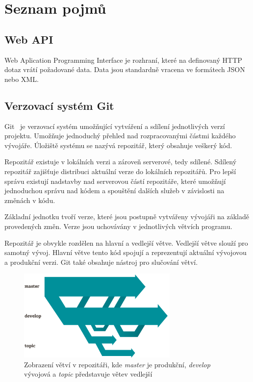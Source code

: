 \documentclass[thesis=B,czech]{FITthesis}[2012/06/26]
\begin{document}
\chapter{Seznam pojmů}

\section{Web API}
Web Aplication Programming Interface je rozhraní, které na definovaný HTTP dotaz vrátí požadované data. Data jsou standardně vracena ve formátech JSON nebo XML.

\section{Verzovací systém Git}
Git~\cite{GIT} je verzovací systém umožňující vytváření a sdílení jednotlivých verzí projektu.
Umožňuje jednoduchý přehled nad rozpracovanými částmi každého vývojáře. Úložiště systému se nazývá repozitář, který obsahuje veškerý kód.
\par
Repozitář existuje v lokálních verzi a zároveň serverové, tedy sdílené. Sdílený repozitář zajišťuje distribuci aktuální verze do lokálních 
repozitářů. Pro lepší správu existují nadstavby nad serverovou částí repozitáře, které umožňují jednoduchou
správu nad kódem a spouštění dalších služeb v závislosti na změnách v kódu.
\par
Základní jednotku tvoří verze, které jsou postupně vytvářeny vývojáři na základě provedených změn.
Verze jsou uchovávány v jednotlivých větvích programu. 
\par
Repozitář je obvykle rozdělen na hlavní a vedlejší větve. Vedlejší větve slouží pro samotný vývoj. 
Hlavní větve tento kód spojují a reprezentují aktuální vývojovou a produkční verzi. Git také obsahuje nástroj pro slučování větví.

\begin{figure}[h]\centering
 	\includegraphics[width=0.7\textwidth]{resources/branches}
	\caption[Větve v Git repozitáři]{Zobrazení větví v repozitáři, kde \textit{master} je produkční, \textit{develop} vývojová a \textit{topic}
	představuje větev vedlejší}\label{fig:vetev}
\end{figure}
\end{document}
